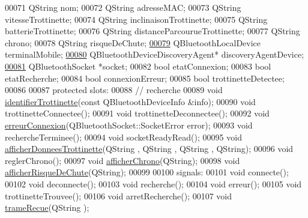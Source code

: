 \begin{DoxyCode}
00071     QString nom; 
00072     QString adresseMAC; 
00073     QString vitesseTrottinette; 
00074     QString inclinaisonTrottinette; 
00075     QString batterieTrottinette; 
00076     QString distanceParcourueTrottinette; 
00077     QString chrono; 
00078     QString risqueDeChute;
\hyperlink{class_peripherique_local_a515044c46ba91db8d0b29362226860aa}{00079}     QBluetoothLocalDevice terminalMobile; 
\hyperlink{class_peripherique_local_a9e398b7dd89a20b1bee67b8c3467da69}{00080}     QBluetoothDeviceDiscoveryAgent* discoveryAgentDevice; 
\hyperlink{class_peripherique_local_a0058bf8367b4b8f907838b83a9150c07}{00081}     QBluetoothSocket *socket; 
00082     \textcolor{keywordtype}{bool} etatConnexion; 
00083     \textcolor{keywordtype}{bool} etatRecherche; 
00084     \textcolor{keywordtype}{bool} connexionErreur; 
00085     \textcolor{keywordtype}{bool} trottinetteDetectee; 
00086 
00087 protected slots:
00088     \textcolor{comment}{// recherche}
00089     \textcolor{keywordtype}{void} \hyperlink{class_peripherique_local_aab3b5a9b584b0191b9f690add1cfa6ed}{identifierTrottinette}(const QBluetoothDeviceInfo &info); 
00090     \textcolor{keywordtype}{void} trottinetteConnectee(); 
00091     \textcolor{keywordtype}{void} trottinetteDeconnectee(); 
00092     \textcolor{keywordtype}{void} \hyperlink{class_peripherique_local_abb86db4a2a3d72a5de32253aa9af1ce8}{erreurConnexion}(QBluetoothSocket::SocketError error); 
00093     \textcolor{keywordtype}{void} rechercheTerminee(); 
00094     \textcolor{keywordtype}{void} socketReadyRead(); 
00095     \textcolor{keywordtype}{void} \hyperlink{class_peripherique_local_a5702930929fea3e197fc1938a2303961}{afficherDonneesTrottinette}(QString , QString , QString , QString); 
00096     \textcolor{keywordtype}{void} reglerChrono(); 
00097     \textcolor{keywordtype}{void} \hyperlink{class_peripherique_local_af567be15ff8eb2a00cb4e0674ebf3004}{afficherChrono}(QString); 
00098     \textcolor{keywordtype}{void} \hyperlink{class_peripherique_local_ac20ba20d69997e441b1b782f8b506291}{afficherRisqueDeChute}(QString);
00099 
00100 signals:
00101     \textcolor{keywordtype}{void} connecte(); 
00102     \textcolor{keywordtype}{void} deconnecte(); 
00103     \textcolor{keywordtype}{void} recherche(); 
00104     \textcolor{keywordtype}{void} erreur(); 
00105     \textcolor{keywordtype}{void} trottinetteTrouvee(); 
00106     \textcolor{keywordtype}{void} arretRecherche(); 
00107     \textcolor{keywordtype}{void} \hyperlink{class_peripherique_local_af980614027f938565b318eb1dfd579c5}{trameRecue}(QString ); 

\end{DoxyCode}
